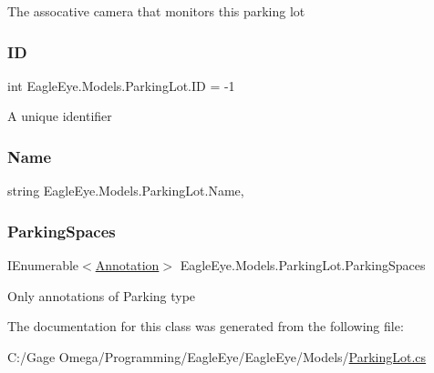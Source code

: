 The assocative camera that monitors this parking lot 

\mbox{\label{class_eagle_eye_1_1_models_1_1_parking_lot_a947f098cf468fb7856e4b72432318a72}} 
\subsubsection{\texorpdfstring{ID}{ID}}
{\footnotesize\ttfamily int Eagle\+Eye.\+Models.\+Parking\+Lot.\+ID = -\/1\hspace{0.3cm}{\ttfamily [get]}}



A unique identifier 

\mbox{\label{class_eagle_eye_1_1_models_1_1_parking_lot_ac2860bd9c6046f6f6b9b10461c0b4619}} 
\subsubsection{\texorpdfstring{Name}{Name}}
{\footnotesize\ttfamily string Eagle\+Eye.\+Models.\+Parking\+Lot.\+Name\hspace{0.3cm}{\ttfamily [get]}, {\ttfamily [set]}}





\mbox{\label{class_eagle_eye_1_1_models_1_1_parking_lot_af3127595a546a4f0b4c4dcda6e72fc3f}} 
\subsubsection{\texorpdfstring{ParkingSpaces}{ParkingSpaces}}
{\footnotesize\ttfamily I\+Enumerable$<$\mbox{\hyperlink{class_eagle_eye_1_1_models_1_1_annotation}{Annotation}}$>$ Eagle\+Eye.\+Models.\+Parking\+Lot.\+Parking\+Spaces\hspace{0.3cm}{\ttfamily [get]}}



Only annotations of Parking type 



The documentation for this class was generated from the following file\+:\begin{DoxyCompactItemize}
\item 
C\+:/\+Gage Omega/\+Programming/\+Eagle\+Eye/\+Eagle\+Eye/\+Models/\mbox{\hyperlink{_models_2_parking_lot_8cs}{Parking\+Lot.\+cs}}\end{DoxyCompactItemize}
